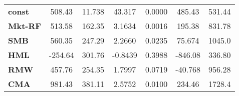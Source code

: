 \begin{center}
\begin{tabular}{lcccccc}
\midrule
\textbf{const}  &       508.43       &       11.738       &      43.317     &      0.0000      &       485.43      &       531.44       \\
\textbf{Mkt-RF} &       513.58       &       162.35       &      3.1634     &      0.0016      &       195.38      &       831.78       \\
\textbf{SMB}    &       560.35       &       247.29       &      2.2660     &      0.0235      &       75.674      &       1045.0       \\
\textbf{HML}    &      -254.64       &       301.76       &     -0.8439     &      0.3988      &      -846.08      &       336.80       \\
\textbf{RMW}    &       457.76       &       254.35       &      1.7997     &      0.0719      &      -40.768      &       956.28       \\
\textbf{CMA}    &       981.43       &       381.11       &      2.5752     &      0.0100      &       234.46      &       1728.4       \\
\bottomrule
\end{tabular}
\end{center}
